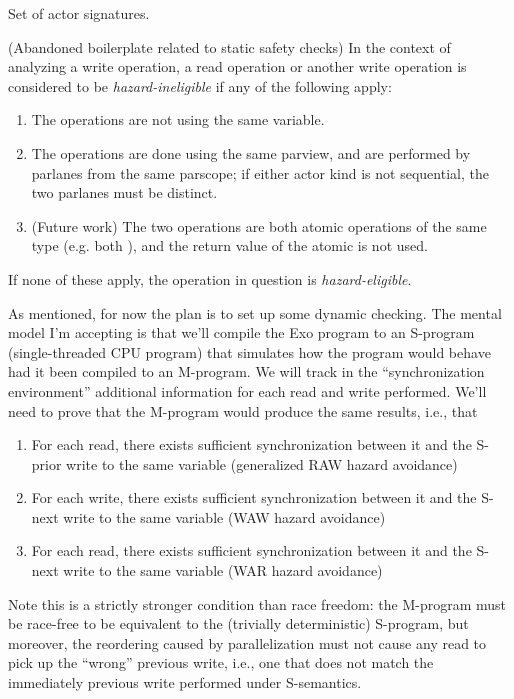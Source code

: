 \filbreak
{}
Set of actor signatures.

\filbreak
{} (Abandoned boilerplate related to static safety checks) In the context of analyzing a write operation, a read operation or another write operation is considered to be \textit{hazard-ineligible} if any of the following apply:

\begin{enumerate}
  \item The operations are not using the same variable.
  \item The operations are done using the same parview, and are performed by parlanes from the same parscope; if either actor kind is not sequential, the two parlanes must be distinct.
  \item (Future work) The two operations are both atomic operations of the same type (e.g. both ), and the return value of the atomic is not used.
\end{enumerate}

If none of these apply, the operation in question is \textit{hazard-eligible}.

\filbreak
{}

As mentioned, for now the plan is to set up some dynamic checking.
The mental model I'm accepting is that we'll compile the Exo program to an S-program (single-threaded CPU program) that simulates how the program would behave had it been compiled to an M-program.
We will track in the ``synchronization environment'' additional information for each read and write performed.
We'll need to prove that the M-program would produce the same results, i.e., that
\begin{enumerate}
  \item For each read, there exists sufficient synchronization between it and the S-prior write to the same variable (generalized RAW hazard avoidance)
  \item For each write, there exists sufficient synchronization between it and the S-next write to the same variable (WAW hazard avoidance)
  \item For each read, there exists sufficient synchronization between it and the S-next write to the same variable (WAR hazard avoidance)
\end{enumerate}

\filbreak
Note this is a strictly stronger condition than race freedom: the M-program must be race-free to be equivalent to the (trivially deterministic) S-program, but moreover, the reordering caused by parallelization must not cause any read to pick up the ``wrong'' previous write, i.e., one that does not match the immediately previous write performed under S-semantics.

